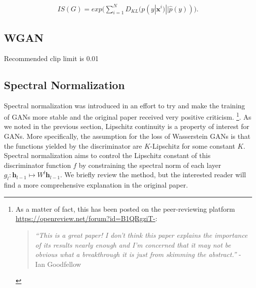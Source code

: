 \begin{equation}
\label{eq_IS2}
\begin{split}
IS(G) = exp\big(\sum^N_{i=1}D_{KL}(p(y|\bm{x}^i)||\hat{p}(y))\big).
\end{split}
\end{equation}


\subsection{WGAN}


Recommended clip limit is 0.01

\subsection{Spectral Normalization}
Spectral normalization \cite{miyato2018spectral} was introduced in an effort to try and make the training of GANs more stable and the original paper received very positive criticism. \footnote{As a matter of fact, this has been posted on the peer-reviewing platform \url{https://openreview.net/forum?id=B1QRgziT-}:
\begin{quote}
\textit{``This is a great paper! I don't think this paper explains the importance of its results nearly enough and I'm concerned that it may not be obvious what a breakthrough it is just from skimming the abstract.''} - Ian Goodfellow
\end{quote}
}. As we noted in the previous section, Lipschitz continuity is a property of interest for GANs. More specifically, the assumption for the loss of Wasserstein GANs is that the functions yielded by the discriminator are $K$-Lipschitz for some constant $K$. Spectral normalization aims to control the Lipschitz constant of this discriminator function $f$ by constraining the spectral norm of each layer 
$
g_l : \bm{h}_{l-1} \mapsto W^{l} \bm{h}_{l-1}
$. We briefly review the method, but the interested reader will find a more comprehensive explanation in the original paper. 

